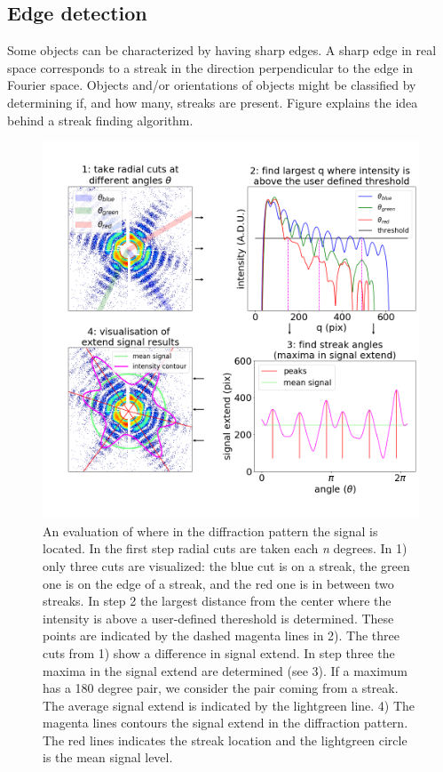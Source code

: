 \subsection{Edge detection}
Some objects can be characterized by having sharp edges. A sharp edge in real space corresponds to a streak in the direction perpendicular to the edge in Fourier space. Objects and/or orientations of objects might be classified by determining if, and how many, streaks are present. Figure explains the idea behind a streak finding algorithm.

\begin{figure}[!h]
\centering
\includegraphics[width=120mm]{Chapter_08_ImageClassification_Edge_Detection.png}
\caption{An evaluation of where in the diffraction pattern the signal is located. In the first step radial cuts are taken each \textit{n} degrees. In 1) only three cuts are visualized: the blue cut is on a streak, the green one is on the edge of a streak, and the red one is in between two streaks. In step 2 the largest distance from the center where the intensity is above a user-defined thereshold is determined. These points are indicated by the dashed magenta lines in 2). The three cuts from 1) show a difference in signal extend. In step three the maxima in the signal extend are determined (see 3). If a maximum has a 180 degree pair, we consider the pair coming from a streak. The average signal extend is indicated by the lightgreen line. 4) The magenta lines contours the signal extend in the diffraction pattern. The red lines indicates the streak location and the lightgreen circle is the mean signal level.}\label{fig:edge_detection}
\end{figure}


